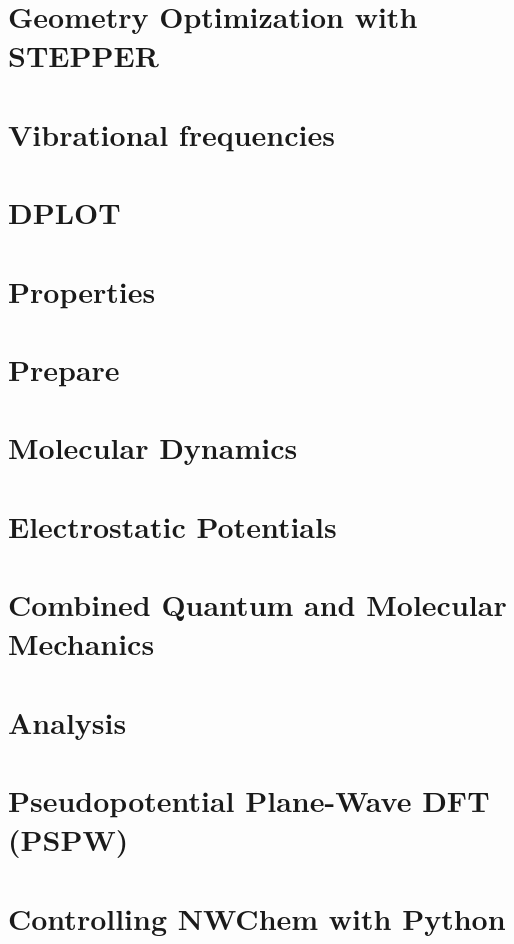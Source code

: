 \documentclass[12pt,fleqn]{book}
\begin{document}
\chapter{Geometry Optimization with STEPPER}


\chapter{Vibrational frequencies}


\chapter{DPLOT}


\chapter{Properties}


\chapter{Prepare}


\chapter{Molecular Dynamics}


\chapter{Electrostatic Potentials}


\chapter{Combined Quantum and Molecular Mechanics}


\chapter{Analysis}



\chapter{Pseudopotential Plane-Wave DFT (PSPW)}


\chapter{Controlling NWChem with Python}

\end{document}
